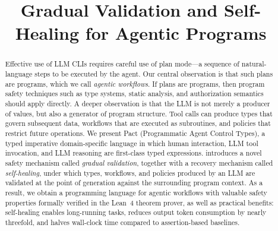 \documentclass[sigconf,screen,review]{acmart}
\begin{document}
\title{Gradual Validation and Self-Healing for Agentic Programs}



\begin{abstract}
  Effective use of LLM CLIs requires careful use of plan mode---a sequence of
  natural-language steps to be executed by the agent. Our central observation
  is that such plans are programs, which we call \emph{agentic workflows}. If
  plans are programs, then program safety techniques such as type systems, static
  analysis, and authorization semantics should apply directly. A deeper
  observation is that the LLM is not merely a producer of values, but also a
  generator of program structure. Tool calls can produce types that govern
  subsequent data, workflows that are executed as subroutines, and policies
  that restrict future operations. We present Pact (Programmatic Agent Control
  Types), a typed imperative domain-specific language in which human
  interaction, LLM tool invocation, and LLM reasoning are first-class typed
  expressions. \pact introduces a novel safety mechanism called
  \emph{gradual validation}, together with a recovery mechanism called
  \emph{self-healing}, under which types, workflows, and policies produced by
  an LLM are validated at the point of generation against the surrounding
  program context. As a result, we obtain a programming language for agentic
  workflows with valuable safety properties formally verified in the Lean~4
  theorem prover, as well as practical benefits: self-healing enables
  long-running tasks, reduces output token consumption by nearly threefold, and
  halves wall-clock time compared to assertion-based baselines.
\end{abstract}

\maketitle















\end{document}
